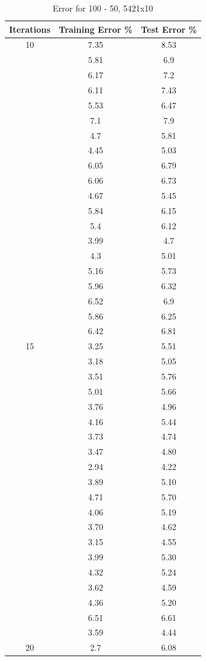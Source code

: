 \documentclass[12pt]{article}
\begin{document}
\begin{table}[h]
	\begin{center}
		\caption{Error for 100 - 50, 5421x10}
		\label{tab:table2}
		\begin{tabular}{|c|c|c|}
			\hline
			\textbf{Iterations} & \textbf{Training Error \%} & \textbf{Test Error \%} \\
			\hline
			10 & 7.35 & 8.53\\
			& 5.81 & 6.9\\
			& 6.17 & 7.2\\
			& 6.11 & 7.43\\
			& 5.53 & 6.47 \\
			& 7.1 & 7.9 \\
			& 4.7 & 5.81 \\
			& 4.45 & 5.03 \\
			& 6.05 & 6.79 \\
			& 6.06 & 6.73 \\
			& 4.67 & 5.45 \\
			& 5.84 & 6.15 \\
			& 5.4 & 6.12 \\
			& 3.99 & 4.7 \\
			& 4.3 & 5.01 \\
			& 5.16 & 5.73 \\
			& 5.96 & 6.32 \\
			& 6.52 & 6.9 \\
			& 5.86 & 6.25 \\
			& 6.42 & 6.81 \\
			\hline
			15 & 3.25 & 5.51\\
			& 3.18 & 5.05\\
			& 3.51 & 5.76\\
			& 5.01 & 5.66\\
			& 3.76 & 4.96\\
			& 4.16 & 5.44\\
			& 3.73 & 4.74\\
			& 3.47 & 4.80\\
			& 2.94 & 4.22\\
			& 3.89 & 5.10\\
			& 4.71 & 5.70\\
			& 4.06 & 5.19\\
			& 3.70 & 4.62\\
			& 3.15 & 4.55\\
			& 3.99 & 5.30\\
			& 4.32 & 5.24\\
			& 3.62 & 4.59\\
			& 4.36 & 5.20\\
			& 6.51 & 6.61\\
			& 3.59 & 4.44\\
			\hline
			20 & 2.7 & 6.08\\
			\hline
		\end{tabular}
	\end{center}
\end{table}
\end{document}
